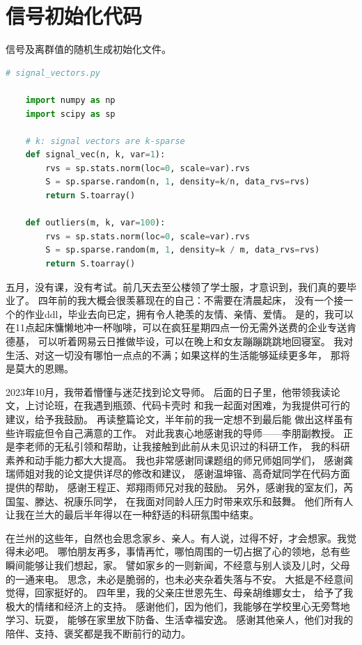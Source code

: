\documentclass[AutoFakeBold]{LZUThesis}
\begin{document}
\section{信号初始化代码}

信号及离群值的随机生成初始化文件。

\begin{lstlisting}[language = python]
    # signal_vectors.py

    import numpy as np
    import scipy as sp
    
    # k: signal vectors are k-sparse
    def signal_vec(n, k, var=1):
        rvs = sp.stats.norm(loc=0, scale=var).rvs
        S = sp.sparse.random(n, 1, density=k/n, data_rvs=rvs)
        return S.toarray()

    def outliers(m, k, var=100):
        rvs = sp.stats.norm(loc=0, scale=var).rvs
        S = sp.sparse.random(m, 1, density=k / m, data_rvs=rvs)
        return S.toarray()
\end{lstlisting}




\Thanks

五月，没有课，没有考试。前几天去至公楼领了学士服，才意识到，我们真的要毕业了。
四年前的我大概会很羡慕现在的自己：不需要在清晨起床，
没有一个接一个的作业ddl，毕业去向已定，拥有令人艳羡的友情、亲情、爱情。
是的，我可以在11点起床慵懒地冲一杯咖啡，可以在疯狂星期四点一份无需外送费的企业专送肯德基，
可以听着网易云日推做毕设，可以在晚上和女友蹦蹦跳跳地回寝室。
我对生活、对这一切没有哪怕一点点的不满；如果这样的生活能够延续更多年，
那将是莫大的恩赐。

2023年10月，我带着懵懂与迷茫找到论文导师。
后面的日子里，他带领我读论文，上讨论班，在我遇到瓶颈、代码卡壳时
和我一起面对困难，为我提供可行的建议，给予我鼓励。
再读整篇论文，半年前的我一定想不到最后能
做出这样虽有些许瑕疵但令自己满意的工作。
对此我衷心地感谢我的导师——李朋副教授。
正是李老师的无私引领和帮助，让我接触到此前从未见识过的科研工作，
我的科研素养和动手能力都大大提高。
我也非常感谢同课题组的师兄师姐同学们，
感谢龚瑞师姐对我的论文提供详尽的修改和建议，
感谢温坤锴、高奇斌同学在代码方面提供的帮助，
感谢王程正、郑翔雨师兄对我的鼓励。
另外，感谢我的室友们，芮国玺、滕达、祝康乐同学，
在我面对同龄人压力时带来欢乐和鼓舞。
他们所有人让我在兰大的最后半年得以在一种舒适的科研氛围中结束。

在兰州的这些年，自然也会思念家乡、亲人。有人说，过得不好，才会想家。我觉得未必吧。
哪怕朋友再多，事情再忙，哪怕周围的一切占据了心的领地，总有些瞬间能够让我们想起，家。
譬如家乡的一则新闻，不经意与别人谈及儿时，父母的一通来电。
思念，未必是脆弱的，也未必夹杂着失落与不安。
大抵是不经意间觉得，回家挺好的。
四年里，我的父亲庄世恩先生、母亲胡维娜女士，
给予了我极大的情绪和经济上的支持。
感谢他们，因为他们，我能够在学校里心无旁骛地学习、玩耍，
能够在家里放下防备、生活幸福安逸。
感谢其他亲人，他们对我的陪伴、支持、褒奖都是我不断前行的动力。
\end{document}
